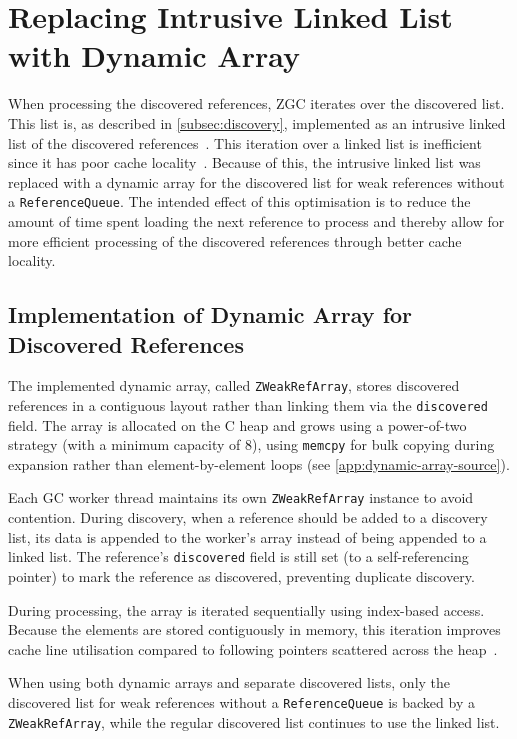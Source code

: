 \section{Replacing Intrusive Linked List with Dynamic Array}
\label{sec:replacing-intrusive-linked-list}
When processing the discovered references, ZGC iterates over the discovered list. This list is, as described in \cref{subsec:discovery}, implemented as an intrusive linked list of the discovered references~\cite{openjdk-zreferenceprocessor-cpp}. This iteration over a linked list is inefficient since it has poor cache locality~\cite{drepper07-memory}. Because of this, the intrusive linked list was replaced with a dynamic array for the discovered list for weak references without a \texttt{ReferenceQueue}. The intended effect of this optimisation is to reduce the amount of time spent loading the next reference to process and thereby allow for more efficient processing of the discovered references through better cache locality.

\subsection{Implementation of Dynamic Array for Discovered References}
\label{subsec:dynamic-array-impl}

The implemented dynamic array, called \texttt{ZWeakRefArray}, stores discovered references in a contiguous layout rather than linking them via the \texttt{discovered} field. The array is allocated on the C heap and grows using a power-of-two strategy (with a minimum capacity of 8), using \texttt{memcpy} for bulk copying during expansion rather than element-by-element loops (see \cref{app:dynamic-array-source}).

Each GC worker thread maintains its own \texttt{ZWeakRefArray} instance to avoid contention. During discovery, when a reference should be added to a discovery list, its data is appended to the worker's array instead of being appended to a linked list. The reference's \texttt{discovered} field is still set (to a self-referencing pointer) to mark the reference as discovered, preventing duplicate discovery.

During processing, the array is iterated sequentially using index-based access. Because the elements are stored contiguously in memory, this iteration improves cache line utilisation compared to following pointers scattered across the heap~\cite{drepper07-memory}.

When using both dynamic arrays and separate discovered lists, only the discovered list for weak references without a \texttt{ReferenceQueue} is backed by a \texttt{ZWeakRefArray}, while the regular discovered list continues to use the linked list.

